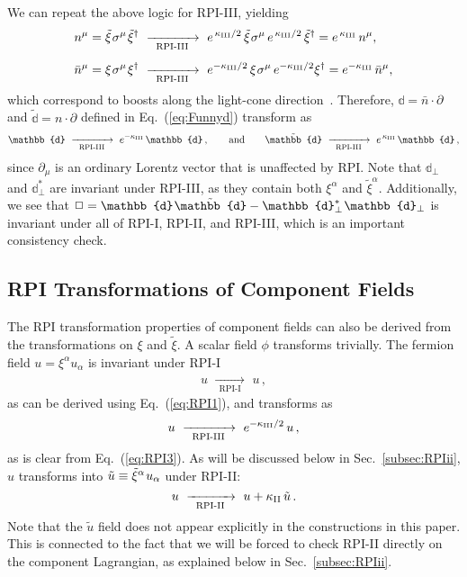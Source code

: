 \documentclass[12pt,document,nofootinbib,superscriptaddress,onecolumn,preprintnumbers,balancelastpage]{article}
\newcommand{\s}{\hspace{0.8pt}}
\newcommand{\PP}{\mathbb{d}}
\newcommand{\RPIi}{\,\,\xrightarrow[\hspace{5pt}\text{RPI-I}\hspace{5pt}]{}\,\,}
\newcommand{\RPIii}{\,\,\xrightarrow[\hspace{5pt}\text{RPI-II}\hspace{5pt}]{}\,\,}
\newcommand{\RPIiii}{\,\,\xrightarrow[\hspace{5pt}\text{RPI-III}\hspace{5pt}]{}\,\,}
\DeclareRobustCommand{\Sec}[1]{Sec.~\ref{#1}}
\DeclareRobustCommand{\Eq}[1]{Eq.~(\ref{#1})}
\begin{document}
\begin{spacing}{1.2}
We can repeat the above logic for RPI-III, yielding
%
\begin{align}
n^\mu = \tilde{\xi}\s \sigma^\mu\s \tilde{\xi}^\dagger &\RPIiii e^{\,\kappa_{\rm III}/2}\, \tilde{\xi}\s \sigma^\mu\, e^{\,\kappa_{\rm III}/2}\, \tilde{\xi}^\dagger = e^{\,\kappa_{\rm III}}\, n^\mu,\\[5pt]
\bar{n}^\mu = \xi\s \sigma^\mu\s \xi^\dagger &\RPIiii  e^{- \kappa_{\rm III}/2}\,\xi\s \sigma^\mu \, e^{- \kappa_{\rm III}/2} \xi^\dagger = e^{- \kappa_{\rm III}}\, \bar{n}^\mu,
\end{align}
%
which correspond to boosts along the light-cone direction~\cite{Marcantonini:2008qn}.
%
Therefore, $\PP =  \bar{n} \cdot \partial$ and $\tilde{\PP} =  n \cdot \partial$ defined in \Eq{eq:Funnyd} transform as
%
\begin{equation}
\PP \RPIiii e^{- \kappa_{\rm III}}\, \PP\,, \qquad\text{and}\qquad \tilde{\PP} \RPIiii e^{\,\kappa_{\rm III}}\, \PP\,,  
\end{equation}
%
since $\partial_\mu$ is an ordinary Lorentz vector that is unaffected by RPI.
%
Note that $\PP_\perp$ and $\PP_\perp^*$ are invariant under RPI-III, as they contain both $\xi^\alpha$ and $\tilde{\xi}^\alpha$.
%
Additionally, we see that $\Box = \PP\s \tilde{\PP}  - \PP_\perp^*\s \PP_\perp$ is invariant under all of RPI-I, RPI-II, and RPI-III, which is an important consistency check.

\subsection{RPI Transformations of Component Fields}
\label{subsec:RPIcomponents}

The RPI transformation properties of component fields can also be derived from the transformations on $\xi$ and $\tilde{\xi}$.
%
A scalar field $\phi$ transforms trivially.
%
The fermion field $u = \xi^\alpha u_\alpha$ is invariant under RPI-I
\begin{align}
u \RPIi u\,,
\end{align}
as can be derived using \Eq{eq:RPI1}, and transforms as 
\begin{align}
u \RPIiii e^{-\kappa_{\rm III}/2}\, u\,,
\end{align} 
as is clear from \Eq{eq:RPI3}.
%
As will be discussed below in \Sec{subsec:RPIii}, $u$ transforms into $\tilde{u} \equiv  \tilde{\xi}^\alpha \s u_\alpha$ under RPI-II: 
%
\begin{equation}
\label{eq:RPI2_on_u}
u \RPIii u + \kappa_{\rm II} \,\tilde{u}\,.
\end{equation}
%
Note that the $\tilde{u}$ field does not appear explicitly in the constructions in this paper.
%
This is connected to the fact that we will be forced to check RPI-II directly on the component Lagrangian, as explained below in \Sec{subsec:RPIii}.



\end{spacing}
\end{document}
